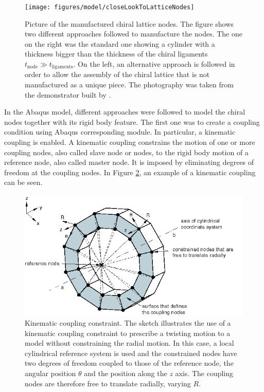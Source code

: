     \begin{figure}[!htpb]
      \centering
      \texttt{[image: figures/model/closeLookToLatticeNodes]}
      \caption[Picture of the manufactured chiral lattice nodes]{Picture of the manufactured chiral lattice nodes. The figure shows two different approaches followed to manufacture the nodes. The one on the right was the standard one showing a cylinder with a thickness bigger than the thickness of the chiral ligaments $t_{\mathrm{node}} \gg t_{\mathrm{ligaments}}$. On the left, an alternative approach is followed in order to allow the assembly of the chiral lattice that is not manufactured as a unique piece. The photography was taken from the demonstrator built by \cite{Vincenz2017}.}\label{fig:closeLookToLatticeNodes}
    \end{figure}

    In the Abaqus model, different approaches were followed to model the chiral nodes together with its rigid body feature. The first one was to create a coupling condition using Abaqus corresponding module. In particular, a kinematic coupling is enabled. A kinematic coupling constrains the motion of one or more coupling nodes, also called slave node or nodes, to the rigid body motion of a reference node, also called master node. It is imposed by eliminating degrees of freedom at the coupling nodes. In Figure \ref{fig:kinematicCoupling}, an example of a kinematic coupling can be seen.

    \begin{figure}[!htpb]
      \centering
      \includegraphics[width=0.8 \textwidth]{figures/model/pcoupling-kinematic}
      \caption[Kinematic coupling constraint]{Kinematic coupling constraint. The sketch illustrates the use of a kinematic coupling constraint to prescribe a twisting motion to a model without constraining the radial motion. In this case, a local cylindrical reference system is used and the constrained nodes have two degrees of freedom coupled to those of the reference node, the angular position $\theta$ and the position along the $z$ axis. The coupling nodes are therefore free to translate radially, varying $R$. \cite{Abaqus}}\label{fig:kinematicCoupling}
    \end{figure}

